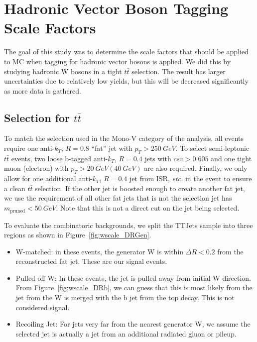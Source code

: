 \documentclass{article}
\begin{document}
\section{Hadronic Vector Boson Tagging Scale Factors} \label{sec:wscale}

The goal of this study was to determine the scale factors that should
be applied to MC when tagging for hadronic vector bosons is applied.
We did this by studying hadronic W bosons in a tight $t\bar{t}$ selection.
The result has larger uncertainties due to relatively low yields,
but this will be decreased significantly as more data is gathered.

\subsection{Selection for $t\bar{t}$} \label{sec:wscale_selection}

To match the selection used in the Mono-V category of the analysis,
all events require one anti-$k_T$, $R = 0.8$ ``fat'' jet with $p_T > \SI{250}{GeV}$.
To select semi-leptonic $t\bar{t}$ events, two loose b-tagged anti-$k_T$, $R = 0.4$
jets with $csv > 0.605$ and one tight muon (electron) with
$p_T > \SI{20}{GeV} (\SI{40}{GeV})$ are also required.
Finally, we only allow for one additional anti-$k_T$, $R = 0.4$ jet from ISR, \emph{etc.}
in the event to ensure a clean $t\bar{t}$ selection.
If the other jet is boosted enough to create another fat jet, we use the requirement 
of all other fat jets that is not the selection jet has $m_\text{pruned} < \SI{50}{GeV}$.
Note that this is not a direct cut on the jet being selected.

To evaluate the combinatoric backgrounds, we split the TTJets sample into three regions
as shown in Figure~\ref{fig:wscale_DRGen}.
\begin{itemize}
\item W-matched: in these events, the generator W is within $\Delta R < 0.2$ from the
  reconstructed fat jet. These are our signal events.
\item Pulled off W: In these events, the jet is pulled away from initial W direction.
  From Figure~\ref{fig:wscale_DRb}, we can guess that this is most likely from the jet from
  the W is merged with the b jet from the top decay.
  This is not considered signal.
\item Recoiling Jet: For jets very far from the nearest generator W, we assume the selected
  jet is actually a jet from an additional radiated gluon or pileup.
\end{itemize}
\end{document}
